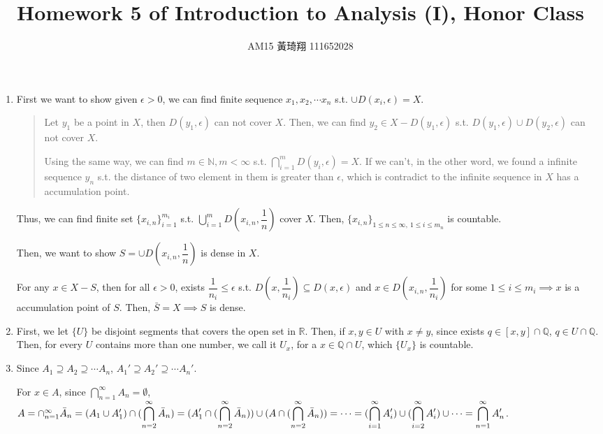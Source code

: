 \documentclass[12pt]{article}
\title{Homework 5 of Introduction to Analysis (I), Honor Class}
\author{AM15 黃琦翔 111652028}
\begin{document}
\maketitle
\begin{enumerate}
    \item First we want to show given $\epsilon > 0$, we can find finite sequence $x_1, x_2, \cdots x_n$ s.t. $\cup D(x_i, \epsilon) = X$.
    \begin{quote}
        Let $y_1$ be a point in $X$, then $D(y_1, \epsilon)$ can not cover $X$.
        Then, we can find $y_2\in X-D(y_1, \epsilon)$ s.t. $D(y_1, \epsilon) \cup D(y_2, \epsilon)$ can not cover $X$.

        Using the same way, we can find $m \in \mathbb{N}, m < \infty$ s.t. $\displaystyle\bigcap_{i=1}^m D(y_i, \epsilon) = X$.
        If we can't, in the other word, we found a infinite sequence $y_n$ s.t. the distance of two element in them is greater than $\epsilon$,
        which is contradict to the infinite sequence in $X$ has a accumulation point.
    \end{quote} 

    Thus, we can find finite set $\lbrace x_{i, n}\rbrace_{i=1}^{m_i}$ s.t. $\displaystyle\bigcup_{i=1}^{m} D(x_{i, n}, \dfrac{1}{n})$ cover $X$.
    Then, $\lbrace x_{i, n}\rbrace_{1\leq n\leq \infty,\ 1\leq i\leq m_n}$ is countable.

    Then, we want to show $S = \cup D(x_{i, n}, \dfrac{1}{n})$ is dense in $X$.

    For any $x\in X-S$, then for all $\epsilon > 0$, exists $\dfrac{1}{n_i} \leq \epsilon$ s.t. $D(x, \dfrac{1}{n_i})\subseteq D(x, \epsilon)$ and
    $x \in D(x_{i, n}, \dfrac{1}{n_i})$ for some $1\leq i \leq m_i\implies x$ is a accumulation point of $S$. Then, $\bar{S} = X\implies S$ is dense.


    \item First, we let $\lbrace U\rbrace$ be disjoint segments that covers the open set in $\mathbb{R}$.
    Then, if $x, y \in U$ with $x\neq y$, since exists $q \in [x, y]\cap \mathbb{Q}$, $q \in U\cap \mathbb{Q}$.
    Then, for every $U$ contains more than one number, we call it $U_x$, for a $x\in \mathbb{Q} \cap U$, which $\lbrace U_x \rbrace$ is countable.


    \newpage
    \item Since $A_1 \supseteq A_2\supseteq \cdots A_n$, $A_1' \supseteq A_2'\supseteq \cdots A_n'$.
    
    For $x \in A$, since $\displaystyle\bigcap_{n=1}^{\infty} A_n = \emptyset$, $A = \cap_{n=1}^{\infty} \bar{A}_n = (A_1\cup A_1') \cap (\displaystyle\bigcap_{n=2}^{\infty} \bar{A}_n)\\
    = (A_1' \cap (\displaystyle\bigcap_{n=2}^{\infty} \bar{A}_n)) \cup (A \cap (\displaystyle\bigcap_{n=2}^{\infty} \bar{A}_n)) = \cdots = (\displaystyle\bigcap_{i=1}^{\infty} A_i') \cup (\displaystyle\bigcap_{i=2}^{\infty} A_i') \cup \cdots = \displaystyle\bigcap_{n=1}^{\infty} A_n'$.
    

\end{enumerate}
\end{document}
